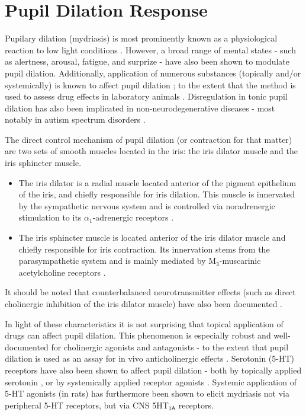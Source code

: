     \section{Pupil Dilation Response}
	Pupilary dilation (mydriasis) is most prominently known as a physiological reaction to low light conditions \cite{Ellis1981}. 
	However, a broad range of mental states - 
	such as alertness\cite{Yoss1970}, arousal\cite{Bradshaw1967}, fatigue\cite{Morad2000}, and surprize\cite{Preuschoff2011} -
	have also been shown to modulate pupil dilation.
	Additionally, application of numerous substances (topically and/or systemically) is known to affect pupil dilation \cite{Theofilopoulos1988, Bye1979, Phillips2000}; to the extent that the method is used to assess drug effects in laboratory animals \cite{Murray1981}.
	Disregulation in tonic pupil dilation has also been implicated in non-neurodegenerative diseases - most notably in autism spectrum disorders \cite{Anderson2013}.
	
	The direct control mechanism of pupil dilation (or contraction for that matter) are two sets of smooth muscles located in the iris: the iris dilator muscle and the iris sphincter muscle.
	\begin{itemize}
	    \item The iris dilator is a radial muscle located anterior of the pigment epithelium of the iris, and chiefly responsible for iris dilation.
	    This muscle is innervated by the sympathetic nervous system and is controlled via noradrenergic stimulation to its $\alpha_1$-adrenergic receptors \cite{vanAlphen1976}.
	    \item The iris sphincter muscle is located anterior of the iris dilator muscle and chiefly responsible for iris contraction.
	    Its innervation stems from the parasympathetic system and is mainly mediated by M$\mathsf{_3}$-muscarinic acetylcholine receptors \cite{Woldemussie1993,Taylor1974}.
	\end{itemize}
	It should be noted that counterbalanced neurotransmitter effects (such as direct cholinergic inhibition of the iris dilator muscle) have also been documented \cite{Yoshitomi1985}.
	
	In light of these characteristics it is not surprising that topical application of drugs can affect pupil dilation.
	This phenomenon is especially robust and well-documented for cholinergic agonists \cite{Smith1978} and antagonists \cite{Gambill1967} -
	to the extent that pupil dilation is used as an assay for in vivo anticholinergic effects \cite{Bye1979}.
	Serotonin (5-HT) receptors have also been shown to affect pupil dilation - both by topically applied serotonin \cite{KOELLA1962}, or by systemically applied receptor agonists \cite{Yu2004}.
	Systemic application of 5-HT agonists (in rats) has furthermore been shown to elicit mydriasis not via peripheral 5-HT receptors, but via CNS 5HT$\mathsf{_{1A}}$ receptors.
	
